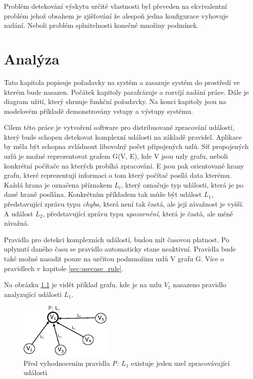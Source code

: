 \documentclass[
  digital, %
  table,   %
  nolof,     %
  nolot,     %
  oneside, %
  nocover,
  monochrome,
  12pt
]{fithesis3}
\begin{document}
Problém detekování výskytu určité vlastnosti byl převeden na ekvivalentní problém jehož obsahem je zjišťování že alespoň jedna konfigurace vyhovuje zadání. Neboli problém splnitelnosti konečné množiny podmínek.

\chapter{Analýza}
\label{sec:analysis}

Tato kapitola popisuje požadavky na systém a zasazuje systém do prostředí ve kterém bude nasazen. Počátek kapitoly parafrázuje a rozvíjí zadání práce. Dále je diagram užití, který shrnuje funkční požadavky. Na konci kapitoly jsou na modelovém příkladě demonstrovány vstupy a výstupy systému.

Cílem této práce je vytvoření software pro distribuované zpracování událostí, který bude schopen detekovat komplexní události na základě pravidel. Aplikace by měla být schopna zvládnout libovolný počet připojených uzlů. Síť propojených uzlů je možné reprezentovat grafem G(V, E), kde V jsou uzly grafu, neboli konkrétní počítače na kterých probíhá zpracování. E jsou pak orientované hrany grafu, které reprezentují informaci o tom který počítač posílá data kterému. Každá hrana je označena příznakem \textit{$L_i$}, který označuje typ události, která je po dané hraně posílána. Konkrétním příkladem tak může být událost \textit{$L_1$}, představující zprávu typu \textit{chyba}, která není tak častá, ale její závažnost je vyšší. A událost \textit{$L_2$}, představující zprávu typu \textit{upozornění}, která je častá, ale méně závažná.

Pravidla pro detekci komplexních událostí, budou mít časovou platnost. Po uplynutí daného času se pravidlo automaticky stane neaktivní. Pravidla bude také možné nasadit pouze na určitou podmnožinu uzlů V grafu G. Více o pravidlech v kapitole \ref{sec:usecase_rule}.

Na obrázku \ref{fig:analysis_case_1} je vidět příklad grafu, kde je na uzlu \textit{$V_1$} nasazeno pravidlo analyzující události \textit{$L_1$}.

\begin{figure}[H]
	\centering
    \includegraphics[width=0.4\textwidth, height=0.15\textheight]{images/analysis_case_1.eps}
    \caption{Před vyhodnocením pravidla \textit{P: $L_1$} existuje jeden uzel zpracovávající události}
    \label{fig:analysis_case_1}
\end{figure}
\end{document}
